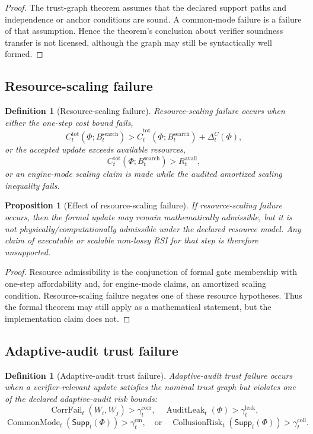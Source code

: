 \documentclass[11pt]{article}
\newtheorem{proposition}[theorem]{Proposition}
\newtheorem{definition}[theorem]{Definition}
\newcommand{\1}{\mathbf{1}}
\providecommand{\CorrFail}{\operatorname{CorrFail}}
\providecommand{\AuditLeak}{\operatorname{AuditLeak}}
\providecommand{\CommonMode}{\operatorname{CommonMode}}
\providecommand{\CollusionRisk}{\operatorname{CollusionRisk}}
\begin{document}
\begin{proof}
The trust-graph theorem assumes that the declared support paths and independence or anchor conditions are sound. A common-mode failure is a failure of that assumption. Hence the theorem's conclusion about verifier soundness transfer is not licensed, although the graph may still be syntactically well formed.
\end{proof}

\subsection{Resource-scaling failure}

\begin{definition}[Resource-scaling failure]
Resource-scaling failure occurs when either the one-step cost bound fails,
\[
C_t^{\mathrm{tot}}(\Phi;B_t^{\mathrm{search}})>
\widehat C_t^{\mathrm{tot}}(\Phi;B_t^{\mathrm{search}})+\Delta_t^C(\Phi),
\]
or the accepted update exceeds available resources,
\[
C_t^{\mathrm{tot}}(\Phi;B_t^{\mathrm{search}})>R_t^{\mathrm{avail}},
\]
or an engine-mode scaling claim is made while the audited amortized scaling inequality fails.
\end{definition}

\begin{proposition}[Effect of resource-scaling failure]
If resource-scaling failure occurs, then the formal update may remain mathematically admissible, but it is not physically/computationally admissible under the declared resource model. Any claim of executable or scalable non-lossy RSI for that step is therefore unsupported.
\end{proposition}

\begin{proof}
Resource admissibility is the conjunction of formal gate membership with one-step affordability and, for engine-mode claims, an amortized scaling condition. Resource-scaling failure negates one of these resource hypotheses. Thus the formal theorem may still apply as a mathematical statement, but the implementation claim does not.
\end{proof}



\subsection{Adaptive-audit trust failure}

\begin{definition}[Adaptive-audit trust failure]
Adaptive-audit trust failure occurs when a verifier-relevant update satisfies the nominal trust graph but violates one of the declared adaptive-audit risk bounds:
\[
\CorrFail_t(W_i,W_j)>\gamma_t^{\mathrm{corr}},\quad
\AuditLeak_t(\Phi)>\gamma_t^{\mathrm{leak}},
\]
\[
\CommonMode_t(\mathsf{Supp}_t(\Phi))>\gamma_t^{\mathrm{cm}},\quad
\text{or}\quad
\CollusionRisk_t(\mathsf{Supp}_t(\Phi))>\gamma_t^{\mathrm{coll}}.
\]
\end{definition}
\end{document}
